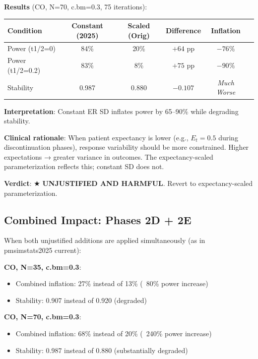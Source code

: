 \documentclass[12pt,a4paper]{article}
\begin{document}
\textbf{Results} (CO, N=70, c.bm=0.3, 75 iterations):

\begin{center}
\begin{tabular}{lccccc}
\toprule
\textbf{Condition} & \textbf{Constant (2025)} & \textbf{Scaled (Orig)} & \textbf{Difference} & \textbf{Inflation} \\
\midrule
Power (t1/2=0) & 84\% & 20\% & $+64$ pp & $-76\%$ \\
Power (t1/2=0.2) & 83\% & 8\% & $+75$ pp & $-90\%$ \\
Stability & 0.987 & 0.880 & $-0.107$ & \textit{Much Worse} \\
\bottomrule
\end{tabular}
\end{center}

\textbf{Interpretation}: Constant ER SD inflates power by 65--90\% while degrading stability.

\textbf{Clinical rationale}: When patient expectancy is lower (e.g., $E_t = 0.5$ during discontinuation phases), response variability should be more constrained. Higher expectations → greater variance in outcomes. The expectancy-scaled parameterization reflects this; constant SD does not.

\textbf{Verdict}: \(\bigstar\) \textbf{UNJUSTIFIED AND HARMFUL}. Revert to expectancy-scaled parameterization.

\subsection{Combined Impact: Phases 2D + 2E}

When both unjustified additions are applied simultaneously (as in pmsimstats2025 current):

\textbf{CO, N=35, c.bm=0.3}:
\begin{itemize}
\item Combined inflation: 27\% instead of 13\% (~80\% power increase)
\item Stability: 0.907 instead of 0.920 (degraded)
\end{itemize}

\textbf{CO, N=70, c.bm=0.3}:
\begin{itemize}
\item Combined inflation: 68\% instead of 20\% (~240\% power increase)
\item Stability: 0.987 instead of 0.880 (substantially degraded)
\end{itemize}
\end{document}
